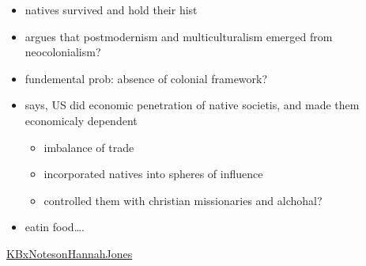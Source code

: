 \documentclass[letterpaper]{article}
\begin{document}
\begin{itemize}
\item natives survived and hold their hist
\item argues that postmodernism and multiculturalism emerged from
neocolonialism?
\item fundemental prob: absence of colonial framework?
\item says, US did economic penetration of native societis, and made them
economicaly dependent

\begin{itemize}
\item imbalance of trade
\item incorporated natives into spheres of influence
\item controlled them with christian missionaries and alchohal?
\end{itemize}

\item eatin food\ldots{}.
\end{itemize}

\href{KBxNotesonHannahJones.org}{KBxNotesonHannahJones}
\end{document}
